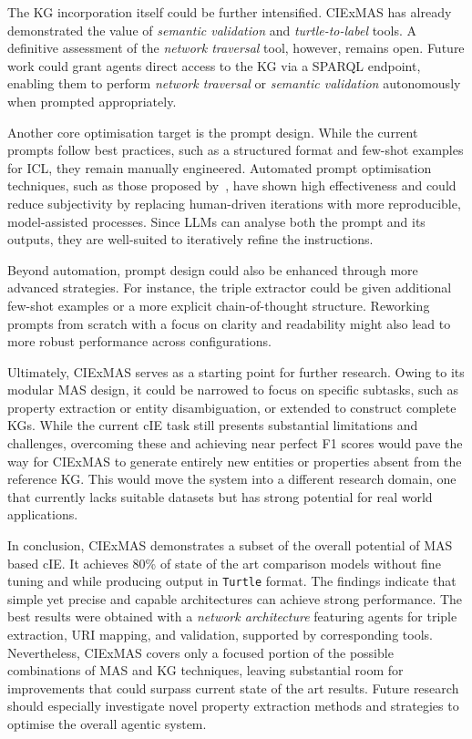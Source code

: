 \documentclass[a4paper,oneside,bibliography=totoc]{scrbook}
\begin{document}
The \ac{KG} incorporation itself could be further intensified. CIExMAS has already demonstrated the value of \textit{semantic validation} and \textit{turtle-to-label} tools. A definitive assessment of the \textit{network traversal} tool, however, remains open. Future work could grant agents direct access to the \ac{KG} via a \ac{SPARQL} endpoint, enabling them to perform \textit{network traversal} or \textit{semantic validation} autonomously when prompted appropriately.

Another core optimisation target is the prompt design. While the current prompts follow best practices, such as a structured format and few-shot examples for \ac{ICL}, they remain manually engineered. Automated prompt optimisation techniques, such as those proposed by~\citet{Agrawal2025}, have shown high effectiveness and could reduce subjectivity by replacing human-driven iterations with more reproducible, model-assisted processes. Since \acp{LLM} can analyse both the prompt and its outputs, they are well-suited to iteratively refine the instructions.

Beyond automation, prompt design could also be enhanced through more advanced strategies. For instance, the triple extractor could be given additional few-shot examples or a more explicit chain-of-thought structure. Reworking prompts from scratch with a focus on clarity and readability might also lead to more robust performance across configurations.

Ultimately, CIExMAS serves as a starting point for further research. Owing to its modular \ac{MAS} design, it could be narrowed to focus on specific subtasks, such as property extraction or entity disambiguation, or extended to construct complete \acp{KG}. While the current \ac{cIE} task still presents substantial limitations and challenges, overcoming these and achieving near perfect F1 scores would pave the way for CIExMAS to generate entirely new entities or properties absent from the reference \ac{KG}. This would move the system into a different research domain, one that currently lacks suitable datasets but has strong potential for real world applications.

In conclusion, CIExMAS demonstrates a subset of the overall potential of \ac{MAS} based \ac{cIE}. It achieves 80\% of state of the art comparison models without fine tuning and while producing output in \texttt{Turtle} format. The findings indicate that simple yet precise and capable architectures can achieve strong performance. The best results were obtained with a \textit{network architecture} featuring agents for triple extraction, \ac{URI} mapping, and validation, supported by corresponding tools. Nevertheless, CIExMAS covers only a focused portion of the possible combinations of \ac{MAS} and \ac{KG} techniques, leaving substantial room for improvements that could surpass current state of the art results. Future research should especially investigate novel property extraction methods and strategies to optimise the overall agentic system.
\end{document}

